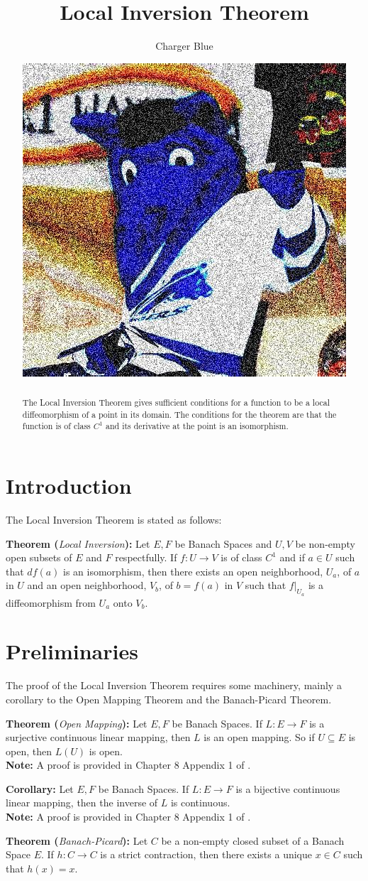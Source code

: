 \documentclass{article}
\title{Local Inversion Theorem}
\author{Charger Blue}
\date{\includegraphics[scale=0.2]{charger_blue.jpg}} %
\begin{document}
\maketitle
\begin{abstract}
    The Local Inversion Theorem gives sufficient conditions for a function to be a local diffeomorphism of a point in its domain.  The conditions for the theorem are that the function is of class \(C^1\) and its derivative at the point is an isomorphism.
\end{abstract}

\section{Introduction}

The Local Inversion Theorem is stated as follows:

\textbf{Theorem (}\textit{Local Inversion}\textbf{):} Let \(E,F\) be Banach Spaces and \(U,V\) be non-empty open subsets of \(E\) and \(F\) respectfully.  If \(f:U\to V\) is of class \(C^1\) and if \(a\in U\) such that \(df(a)\) is an isomorphism, then there exists an open neighborhood, \(U_a\), of \(a\) in \(U\) and an open neighborhood, \(V_b\), of \(b=f(a)\) in \(V\) such that \(f|_{U_a}\) is a diffeomorphism from \(U_a\) onto \(V_b\).

\section{Preliminaries}

The proof of the Local Inversion Theorem requires some machinery, mainly a corollary to the Open Mapping Theorem and the Banach-Picard Theorem.  

\textbf{Theorem (}\textit{Open Mapping}\textbf{):} Let \(E,F\) be Banach Spaces.  If \(L:E\to F\) is a surjective continuous linear mapping, then \(L\) is an open mapping. So if \(U\subseteq E\) is open, then \(L(U)\) is open.\\
\textbf{Note:} A proof is provided in Chapter 8 Appendix 1 of \cite{coleman}.

\textbf{Corollary:} Let \(E,F\) be Banach Spaces.  If \(L:E\to F\) is a bijective continuous linear mapping, then the inverse of \(L\) is continuous.\\
\textbf{Note:} A proof is provided in Chapter 8 Appendix 1 of \cite{coleman}.

\textbf{Theorem (}\textit{Banach-Picard}\textbf{):} Let \(C\) be a non-empty closed subset of a Banach Space \(E\).  If \(h:C\to C\) is a strict contraction, then there exists a unique \(x\in C\) such that \(h(x)=x\).
\end{document}
